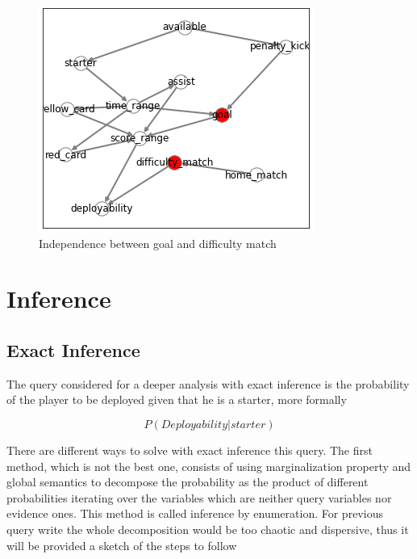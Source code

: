 \documentclass[a4paper,10pt]{report}
\begin{document}
\begin{figure}[h]
\begin{minipage}[b]{0.45\textwidth}
    \includegraphics[width=\textwidth]{assets/img/Independence.PNG}
    \caption{Independence between goal and difficulty match}
\label{fig:independence}
  \end{minipage}
\end{figure}




\chapter{Inference}\label{chap:chapter-5}

\section{Exact Inference}\label{sec:section-51}

The query considered for a deeper analysis with exact inference is the probability of the player to be deployed given that he is a starter, more formally

\[ P(Deployability|starter) \]

There are different ways to solve with exact inference this query.
The first method, which is not the best one, consists of using marginalization property and global semantics to decompose the probability as the product of different probabilities iterating over the variables which are neither query variables nor evidence ones. This method is called inference by enumeration.
For previous query write the whole decomposition would be too chaotic and dispersive, thus it will be provided a sketch of the steps to follow
\end{document}
